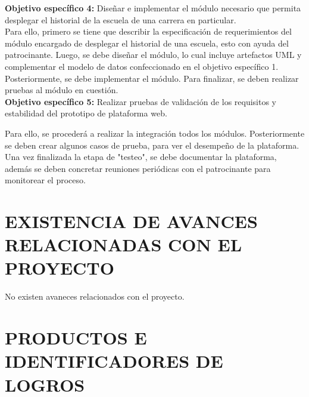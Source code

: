 \documentclass[12pt]{article}
\begin{document}
\textbf{Objetivo específico 4:} Diseñar e implementar el módulo necesario que permita desplegar el historial de la escuela de una carrera en particular.\\


Para ello, primero se tiene que describir la especificación de requerimientos del módulo encargado de desplegar el historial de una escuela, esto con ayuda del patrocinante. 
Luego, se debe diseñar el módulo, lo cual incluye artefactos UML y complementar el modelo de datos confeccionado en el objetivo específico 1. Posteriormente, se debe implementar el módulo. Para finalizar, se deben realizar pruebas al módulo en cuestión.
\\

\textbf{Objetivo específico 5:}  Realizar pruebas de validación de los requisitos y estabilidad del prototipo de
plataforma web.

Para ello, se procederá a realizar la integración todos los  módulos. Posteriormente se deben crear algunos casos de prueba, para ver el desempeño de la plataforma. Una vez finalizada la etapa de "testeo", se debe documentar la plataforma, además se deben concretar reuniones periódicas con el patrocinante para monitorear el proceso.
				
				
				
\section{EXISTENCIA DE AVANCES RELACIONADAS CON EL PROYECTO}
	No existen avaneces relacionados con el proyecto.
\section{PRODUCTOS E IDENTIFICADORES DE LOGROS}
\end{document}
